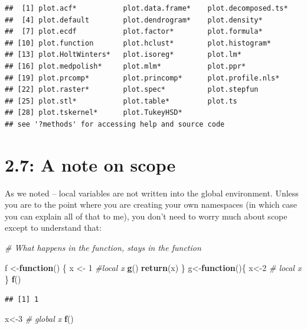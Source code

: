 \documentclass[]{article}
\newenvironment{Shaded}{\begin{snugshade}}{\end{snugshade}}
\newcommand{\KeywordTok}[1]{\textcolor[rgb]{0.13,0.29,0.53}{\textbf{#1}}}
\newcommand{\DecValTok}[1]{\textcolor[rgb]{0.00,0.00,0.81}{#1}}
\newcommand{\StringTok}[1]{\textcolor[rgb]{0.31,0.60,0.02}{#1}}
\newcommand{\CommentTok}[1]{\textcolor[rgb]{0.56,0.35,0.01}{\textit{#1}}}
\newcommand{\ControlFlowTok}[1]{\textcolor[rgb]{0.13,0.29,0.53}{\textbf{#1}}}
\newcommand{\NormalTok}[1]{#1}
\begin{document}
\begin{verbatim}
##  [1] plot.acf*           plot.data.frame*    plot.decomposed.ts*
##  [4] plot.default        plot.dendrogram*    plot.density*      
##  [7] plot.ecdf           plot.factor*        plot.formula*      
## [10] plot.function       plot.hclust*        plot.histogram*    
## [13] plot.HoltWinters*   plot.isoreg*        plot.lm*           
## [16] plot.medpolish*     plot.mlm*           plot.ppr*          
## [19] plot.prcomp*        plot.princomp*      plot.profile.nls*  
## [22] plot.raster*        plot.spec*          plot.stepfun       
## [25] plot.stl*           plot.table*         plot.ts            
## [28] plot.tskernel*      plot.TukeyHSD*     
## see '?methods' for accessing help and source code
\end{verbatim}

\section{2.7: A note on scope}\label{a-note-on-scope}

As we noted -- local variables are not written into the global
environment. Unless you are to the point where you are creating your own
namespaces (in which case you can explain all of that to me), you don't
need to worry much about scope except to understand that:

\begin{Shaded}
\begin{Highlighting}[]
\CommentTok{# What happens in the function, stays in the function}

\NormalTok{f <-}\ControlFlowTok{function}\NormalTok{() \{}
\NormalTok{  x <-}\StringTok{ }\DecValTok{1} \CommentTok{#local x}
  \KeywordTok{g}\NormalTok{()}
  \KeywordTok{return}\NormalTok{(x)}
\NormalTok{\}}
\NormalTok{g<-}\ControlFlowTok{function}\NormalTok{()\{}
\NormalTok{  x<-}\DecValTok{2} \CommentTok{# local x}
\NormalTok{\}}
\KeywordTok{f}\NormalTok{()}
\end{Highlighting}
\end{Shaded}

\begin{verbatim}
## [1] 1
\end{verbatim}

\begin{Shaded}
\begin{Highlighting}[]
\NormalTok{x<-}\DecValTok{3} \CommentTok{# global x}
\KeywordTok{f}\NormalTok{()}
\end{Highlighting}
\end{Shaded}
\end{document}
